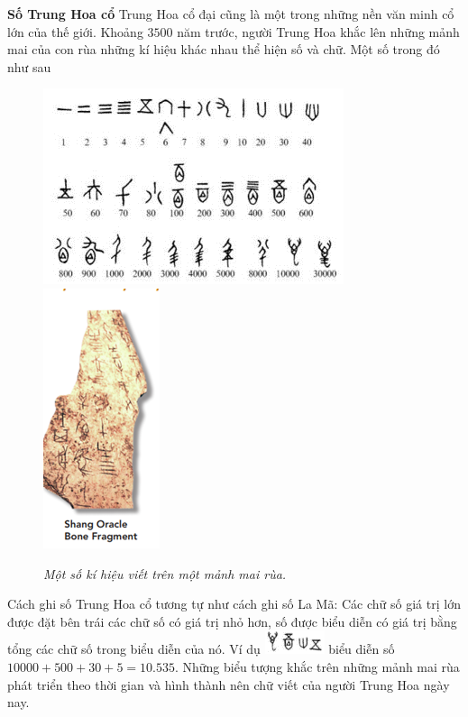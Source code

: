 \begin{multicols}{2}
\begin{figure}[H]
	\end{figure}
	\vskip 0.1cm
	\textbf{Số Trung Hoa cổ}
	\vskip 0.1cm
	Trung Hoa cổ đại cũng là một trong những nền văn minh cổ lớn của thế giới. Khoảng $3500$ năm trước, người Trung Hoa khắc lên  những mảnh mai của con rùa những kí hiệu khác nhau thể hiện số và chữ. Một số trong đó như sau
	\begin{figure}[H]
		\centering
		\captionsetup{labelformat= empty, justification=centering}
		\includegraphics[height=0.45\linewidth]{40}\quad
		\includegraphics[height=0.45\linewidth]{41}
		\caption{\textit{\color{toancuabi}Một số kí hiệu viết trên một mảnh mai rùa.}}
		\vspace*{-10pt}
	\end{figure}
	Cách ghi số Trung Hoa cổ tương tự như cách ghi số La Mã: Các chữ số giá trị lớn được đặt bên trái các chữ số có  giá trị nhỏ hơn, số được biểu diễn có giá trị bằng tổng các chữ số trong biểu diễn của nó. Ví dụ \includegraphics[scale=0.7]{42} biểu diễn số $10000 + 500 + 30 + 5 =10{.}535$. Những biểu tượng khắc trên những mảnh mai rùa phát triển theo thời gian và hình thành nên chữ viết của người Trung Hoa ngày nay. 
	\vskip 0.1cm
	\begin{figure}[H]

\end{figure}
\end{multicols}

